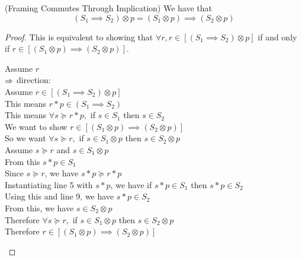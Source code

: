 \begin{lemma}{(Framing Commutes Through Implication)}
We have that
\begin{displaymath}
  (S_1 \implies S_2) \otimes p = (S_1 \otimes p) \implies (S_2 \otimes p) 
\end{displaymath}
\end{lemma}

\begin{proof}
This is equivalent to showing that $\forall r, r \in [(S_1 \implies S_2) \otimes p]$ if and
only if $r \in [(S_1 \otimes p) \implies (S_2 \otimes p)]$. 

\begin{tabbedproof}
\oo Assume $r$ \\
\ooo $\Rightarrow$ direction:\\
\oooo Assume $r \in [(S_1 \implies S_2) \otimes p]$ \\
\ooooo This means $r * p \in (S_1 \implies S_2)$ \\
\ooooo This means $\forall s \succeq r * p,$ if $s \in S_1$ then $s \in S_2$ \\
\ooooo We want to show $r \in [(S_1 \otimes p) \implies (S_2 \otimes p)]$ \\
\ooooo So we want $\forall s \succeq r,$ if  $s \in S_1 \otimes p$ then $s \in S_2 \otimes p$ \\
\ooooo Assume $s \succeq r$ and $s \in S_1 \otimes p$ \\
\oooooo From this $s * p \in S_1$ \\ 
\oooooo Since $s \succeq r$, we have $s * p \succeq r * p$ \\
\oooooo Instantiating line 5 with $s * p$, we have if $s * p \in S_1$ then $s * p \in S_2$ \\
\oooooo Using this and line 9, we have $s * p \in S_2$ \\
\oooooo From this, we have $s \in S_2 \otimes p$ \\
\ooooo Therefore $\forall s \succeq r,$ if  $s \in S_1 \otimes p$ then $s \in S_2 \otimes p$ \\
\ooooo Therefore $r \in [(S_1 \otimes p) \implies (S_2 \otimes p)]$ \\


\end{tabbedproof}
\end{proof}

